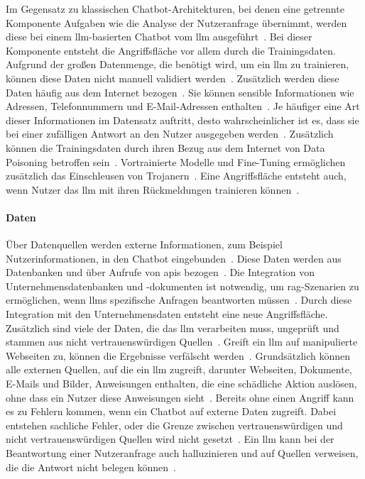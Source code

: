 Im Gegensatz zu klassischen Chatbot-Architekturen, bei denen eine getrennte Komponente Aufgaben wie die Analyse der Nutzeranfrage übernimmt, werden diese bei einem 
\ac{llm}-basierten Chatbot vom \ac{llm} ausgeführt~\cite[8]{cb11}. Bei dieser Komponente entsteht die Angriffsfläche vor allem durch die Trainingsdaten. Aufgrund der 
großen Datenmenge, die benötigt wird, um ein \ac{llm} zu trainieren, können diese Daten nicht manuell validiert werden~\cite[94]{cb05}. Zusätzlich werden diese Daten 
häufig aus dem 
Internet bezogen~\cite[94]{cb05}. Sie können sensible Informationen wie Adressen, Telefonnummern und E-Mail-Adressen enthalten~\cite[3]{pi18}. Je häufiger eine 
Art dieser Informationen im Datensatz auftritt, desto wahrscheinlicher ist es, dass sie bei einer zufälligen Antwort an den Nutzer ausgegeben werden~\cite[3]{pi18}.
Zusätzlich können die Trainingsdaten durch ihren Bezug aus dem Internet von Data Poisoning betroffen sein~\cite[4]{pi18}. Vortrainierte Modelle und Fine-Tuning 
ermöglichen zusätzlich das Einschleusen von Trojanern~\cite[4]{pi18}. Eine Angriffsfläche entsteht auch, wenn Nutzer das \ac{llm} mit ihren Rückmeldungen trainieren 
können~\cite[88]{cb05}.

\paragraph{Daten}

Über Datenquellen werden externe Informationen, zum Beispiel Nutzerinformationen, in den Chatbot eingebunden~\cite[10]{cb11}. Diese Daten werden aus Datenbanken und 
über
Aufrufe von \acp{api} bezogen~\cite[10]{cb11}. Die Integration von Unternehmensdatenbanken und -dokumenten ist notwendig, um \ac{rag}-Szenarien zu ermöglichen, wenn 
\acp{llm} spezifische Anfragen beantworten müssen~\cite[3]{pi18}. Durch diese Integration mit den Unternehmensdaten entsteht eine neue Angriffsfläche. Zusätzlich sind 
viele der Daten, die das \ac{llm} verarbeiten muss, ungeprüft und stammen aus nicht vertrauenswürdigen Quellen~\cite[1]{sm08}. Greift ein \ac{llm} auf manipulierte 
Webseiten zu, 
können die Ergebnisse verfälscht werden~\cite[2]{sm08}. Grundsätzlich können alle externen Quellen, auf die ein \ac{llm} zugreift, darunter Webseiten, Dokumente, 
E-Mails und 
Bilder, Anweisungen enthalten, die eine schädliche Aktion auslösen, ohne dass ein Nutzer diese Anweisungen sieht~\cite[11]{pi24}. Bereits ohne einen Angriff kann es zu
Fehlern kommen, wenn ein Chatbot auf externe Daten zugreift. Dabei entstehen sachliche Fehler, oder die Grenze zwischen vertrauenswürdigen und nicht vertrauenswürdigen
Quellen wird nicht gesetzt~\cite[2]{cb09}. Ein \ac{llm} kann bei der Beantwortung einer Nutzeranfrage auch halluzinieren und auf Quellen verweisen, die die 
Antwort nicht belegen können~\cite[10]{cb09}. 

